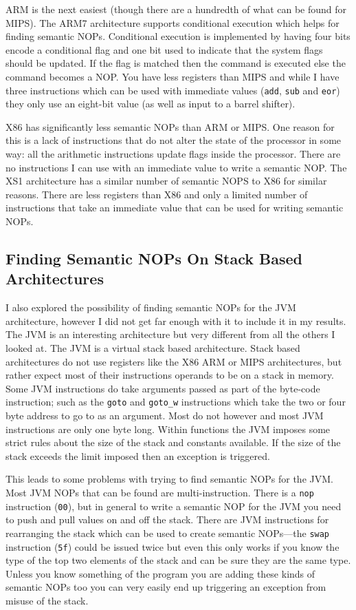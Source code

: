 \documentclass[10pt]{book}
\begin{document}
ARM is the next easiest (though there are a hundredth of what can be
found for MIPS). The ARM7 architecture supports conditional execution
which helps for finding semantic NOPs. Conditional execution is
implemented by having four bits encode a conditional flag and one bit
used to indicate that the system flags should be
updated\autocite{Seal:2000vd}. If the flag is matched then the command
is executed else the command becomes a NOP. You have less registers than
MIPS and while I have three instructions which can be used with
immediate values (\lstinline!add!, \lstinline!sub! and \lstinline!eor!)
they only use an eight-bit value (as well as input to a barrel shifter).

X86 has significantly less semantic NOPs than ARM or MIPS. One reason
for this is a lack of instructions that do not alter the state of the
processor in some way: all the arithmetic instructions update flags
inside the processor. There are no instructions I can use with an
immediate value to write a semantic NOP. The XS1 architecture has a
similar number of semantic NOPS to X86 for similar reasons. There are
less registers than X86 and only a limited number of instructions that
take an immediate value that can be used for writing semantic NOPs.

\subsection{Finding Semantic NOPs On Stack Based Architectures}

I also explored the possibility of finding semantic NOPs for the JVM
architecture, however I did not get far enough with it to include it in
my results. The JVM is an interesting architecture but very different
from all the others I looked at. The JVM is a virtual stack based
architecture\autocite{Lindholm:2012wy}. Stack based architectures do not
use registers like the X86 ARM or MIPS architectures, but rather expect
most of their instructions operands to be on a stack in memory. Some JVM
instructions do take arguments passed as part of the byte-code
instruction; such as the \lstinline!goto! and \lstinline!goto_w!
instructions which take the two or four byte address to go to as an
argument. Most do not however and most JVM instructions are only one
byte long. Within functions the JVM imposes some strict rules about the
size of the stack and constants available. If the size of the stack
exceeds the limit imposed then an exception is triggered.

This leads to some problems with trying to find semantic NOPs for the
JVM. Most JVM NOPs that can be found are multi-instruction. There is a
\lstinline!nop! instruction (\lstinline!00!), but in general to write a
semantic NOP for the JVM you need to push and pull values on and off the
stack. There are JVM instructions for rearranging the stack which can be
used to create semantic NOPs---the \lstinline!swap! instruction
(\lstinline!5f!) could be issued twice but even this only works if you
know the type of the top two elements of the stack and can be sure they
are the same type. Unless you know something of the program you are
adding these kinds of semantic NOPs too you can very easily end up
triggering an exception from misuse of the stack.
\end{document}
